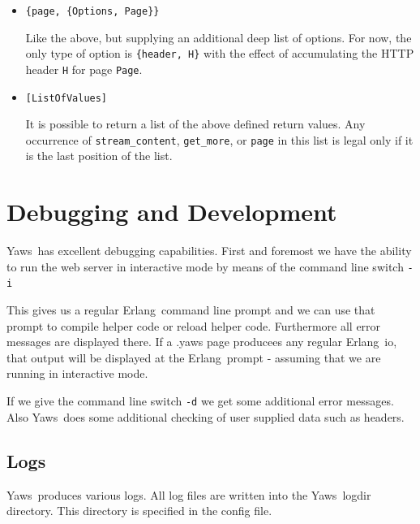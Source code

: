 \documentclass[11pt,oneside,english]{book}
\newcommand{\Erlang}            %
        {{\sc Erlang}}
\newcommand{\Yaws}            %
        {{\sc Yaws}}
\begin{document}
\begin{itemize}
\item       \verb+{page, {Options, Page}}+

              Like the above, but supplying an additional deep list of
              options.  For now, the only type of option is
              \verb+{header, H}+ with the effect of accumulating the
              HTTP header \verb+H+ for page \verb+Page+.

\item       \verb+[ListOfValues]+

              It is possible to return a list of the above defined
              return values.  Any occurrence of \verb+stream_content+,
              \verb+get_more+, or \verb+page+ in this list is legal
              only if it is the last position of the list.

\end{itemize}



\chapter{Debugging and Development}

\Yaws\  has excellent debugging capabilities. First and foremost we
have the ability to run the web server in interactive mode by means of
the command line switch \verb+-i+

This gives us a regular \Erlang\  command line prompt and we can
use that prompt to compile helper code or reload helper
code. Furthermore all error messages are displayed there.
If a .yaws page producees any regular \Erlang\ io, that output will
be displayed at the \Erlang\ prompt - assuming that we are running in interactive mode.

If we give the command line switch \verb+-d+ we get some
additional error messages. Also \Yaws\  does some additional checking
of user supplied data such as headers.

\section{Logs}
\Yaws\  produces various logs. All log files are written into the
\Yaws\  logdir directory. This directory is specified in the config file.
\end{document}
